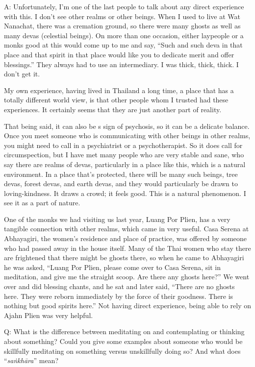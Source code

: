 \vspace{\the\qaskip}
A: Unfortunately, I’m one of the last people to talk about any direct
experience with this. I don’t see other realms or other beings. When I
used to live at Wat Nanachat, there was a cremation ground, so there
were many ghosts as well as many devas (celestial beings). On more than
one occasion, either laypeople or a monks good at this would come up to
me and say, “Such and such deva in that place and that spirit in that
place would like you to dedicate merit and offer blessings.” They always
had to use an intermediary. I was thick, thick, thick. I don’t get it.

My own experience, having lived in Thailand a long time, a place that
has a totally different world view, is that other people whom I trusted
had these experiences. It certainly seems that they are just another
part of reality.

That being said, it can also be s sign of psychosis, so it can be a
delicate balance. Once you meet someone who is communicating with other
beings in other realms, you might need to call in a psychiatrist or a
psychotherapist. So it does call for circumspection, but I have met many
people who are very stable and sane, who say there are realms of devas,
particularly in a place like this, which is a natural environment. In a
place that’s protected, there will be many such beings, tree devas,
forest devas, and earth devas, and they would particularly be drawn to
loving-kindness. It draws a crowd; it feels good. This is a natural
phenomenon. I see it as a part of nature.

One of the monks we had visiting us last year, Luang Por Plien, has a
very tangible connection with other realms, which came in very useful.
Casa Serena at Abhayagiri, the women’s residence and place of practice,
was offered by someone who had passed away in the house itself. Many of
the Thai women who stay there are frightened that there might be ghosts
there, so when he came to Abhayagiri he was asked, “Luang Por Plien,
please come over to Casa Serena, sit in meditation, and give me the
straight scoop. Are there any ghosts here?” We went over and did
blessing chants, and he sat and later said, “There are no ghosts here.
They were reborn immediately by the force of their goodness. There is
nothing but good spirits here.” Not having direct experience, being able
to rely on Ajahn Plien was very helpful.

\vspace{\the\qaskip}
Q: What is the difference between meditating on and contemplating or
thinking about something? Could you give some examples about someone who
would be skillfully meditating on something versus unskillfully doing
so? And what does “\emph{saṅkhāra}” mean?

